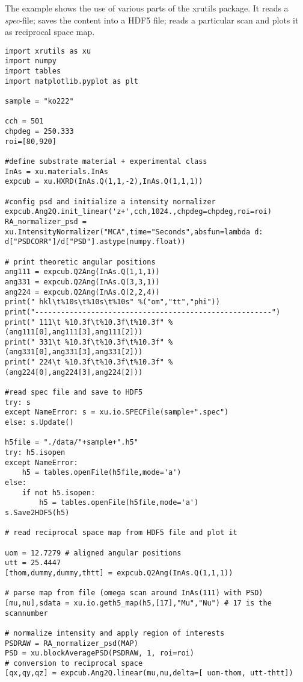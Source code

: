 The example shows the use of various parts of the xrutils package. It reads a \emph{spec}-file; saves the content into a HDF5 file; reads a particular scan and plots it as reciprocal space map.

\begin{lstlisting}[caption={reading a spec-file, saving it to HDF5, reading a particular scan, convert it to reciprocal space, plot it using matplotlib}]
import xrutils as xu
import numpy
import tables
import matplotlib.pyplot as plt

sample = "ko222"

cch = 501
chpdeg = 250.333
roi=[80,920]

#define substrate material + experimental class
InAs = xu.materials.InAs
expcub = xu.HXRD(InAs.Q(1,1,-2),InAs.Q(1,1,1))

#config psd and initialize a intensity normalizer
expcub.Ang2Q.init_linear('z+',cch,1024.,chpdeg=chpdeg,roi=roi)
RA_normalizer_psd = xu.IntensityNormalizer("MCA",time="Seconds",absfun=lambda d: d["PSDCORR"]/d["PSD"].astype(numpy.float))

# print theoretic angular positions
ang111 = expcub.Q2Ang(InAs.Q(1,1,1))
ang331 = expcub.Q2Ang(InAs.Q(3,3,1))
ang224 = expcub.Q2Ang(InAs.Q(2,2,4))
print(" hkl\t%10s\t%10s\t%10s" %("om","tt","phi"))
print("-------------------------------------------------------")
print(" 111\t %10.3f\t%10.3f\t%10.3f" %(ang111[0],ang111[3],ang111[2]))
print(" 331\t %10.3f\t%10.3f\t%10.3f" %(ang331[0],ang331[3],ang331[2]))
print(" 224\t %10.3f\t%10.3f\t%10.3f" %(ang224[0],ang224[3],ang224[2]))

#read spec file and save to HDF5
try: s
except NameError: s = xu.io.SPECFile(sample+".spec")
else: s.Update()

h5file = "./data/"+sample+".h5"
try: h5.isopen
except NameError:
    h5 = tables.openFile(h5file,mode='a')
else: 
    if not h5.isopen:
        h5 = tables.openFile(h5file,mode='a')
s.Save2HDF5(h5)

# read reciprocal space map from HDF5 file and plot it

uom = 12.7279 # aligned angular positions
utt = 25.4447
[thom,dummy,dummy,thtt] = expcub.Q2Ang(InAs.Q(1,1,1))

# parse map from file (omega scan around InAs(111) with PSD)
[mu,nu],sdata = xu.io.geth5_map(h5,[17],"Mu","Nu") # 17 is the scannumber

# normalize intensity and apply region of interests
PSDRAW = RA_normalizer_psd(MAP)
PSD = xu.blockAveragePSD(PSDRAW, 1, roi=roi)
# conversion to reciprocal space
[qx,qy,qz] = expcub.Ang2Q.linear(mu,nu,delta=[ uom-thom, utt-thtt])


\end{lstlisting}
